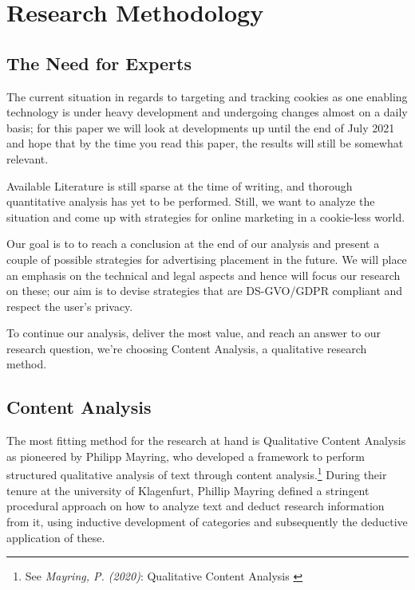 %
%

\pagebreak
\section{Research Methodology}

\onehalfspacing

\subsection{The Need for Experts}

The current situation in regards to targeting and tracking cookies as one enabling technology is under heavy development and undergoing changes almost on a daily basis; for this paper we will look at developments up until the end of July 2021 and hope that by the time you read this paper, the results will still be somewhat relevant.

Available Literature is still sparse at the time of writing, and thorough quantitative analysis has yet to be performed. Still, we want to analyze the situation and come up with strategies for online marketing in a cookie-less world.

Our goal is to to reach a conclusion at the end of our analysis and present a couple of possible strategies for advertising placement in the future. We will place an emphasis on the technical and legal aspects and hence will focus our research on these; our aim is to devise strategies that are DS-GVO/GDPR compliant and respect the user's privacy.

To continue our analysis, deliver the most value, and reach an answer to our research question, we're choosing Content Analysis, a qualitative research method.

\subsection{Content Analysis}

The most fitting method for the research at hand is Qualitative Content Analysis as pioneered by Philipp Mayring, who developed a framework to perform structured qualitative analysis of text through content analysis.\footnote{See \textit{Mayring, P. (2020)}: Qualitative Content Analysis \cite{qualiContent}} During their tenure at the university of Klagenfurt, Phillip Mayring defined a stringent procedural approach on how to analyze text and deduct research information from it, using inductive development of categories and subsequently the deductive application of these.

